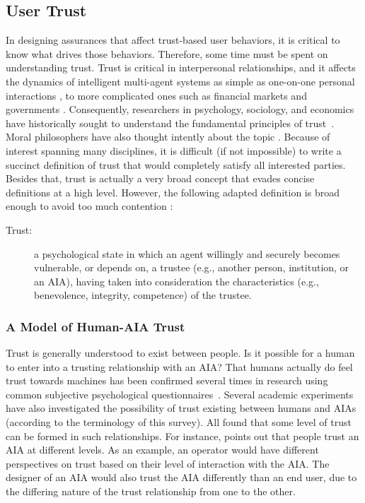 \subsection{User Trust} \label{sec:trust}
    In designing assurances that affect trust-based user behaviors, it is critical to know what drives those behaviors. Therefore, some time must be spent on understanding trust. Trust is critical in interpersonal relationships, and it affects the dynamics of intelligent multi-agent systems as simple as one-on-one personal interactions  \cite{Lewicki2006-hj}, to more complicated ones such as financial markets and governments \cite{Fukuyama1995-un}. Consequently, researchers in psychology, sociology, and economics have historically sought to understand the fundamental principles of trust~\cite{Gambetta1988-pi}. Moral philosophers have also thought intently about the topic \cite{Baier1986-im}. Because of interest spanning many disciplines, it is difficult (if not impossible) to write a succinct definition of trust that would completely satisfy all interested parties. Besides that, trust is actually a very broad concept that evades concise definitions at a high level. However, the following adapted definition is broad enough to avoid too much contention \cite{McKnight2004-vv}:

    \begin{description}
        \item [Trust:] a psychological state in which an agent willingly and securely becomes vulnerable, or depends on, a trustee (e.g., another person, institution, or an AIA), having taken into consideration the characteristics (e.g., benevolence, integrity, competence) of the trustee.
    \end{description}

    \subsubsection{A Model of Human-AIA Trust}
        Trust is generally understood to exist between people. Is it possible for a human to enter into a trusting relationship with an AIA? That humans actually do feel trust towards machines has been confirmed several times in research using common subjective psychological questionnaires~\cite{Muir1996-gt,Mcknight2011-gv,Riley1996-qm,Bainbridge2011-pl,Salem2015-md,Desai2012-rc, Freedy2007-sg, Kaniarasu2013-ho, Wang2016-id}. Several academic experiments have also investigated the possibility of trust existing between humans and AIAs (according to the terminology of this survey).  All found that some level of trust can be formed in such relationships. For instance, \citet{Lacher2014-yc} points out that people trust an AIA at different levels. As an example, an operator would have different perspectives on trust based on their level of interaction with the AIA. The designer of an AIA would also trust the AIA differently than an end user, due to the differing nature of the trust relationship from one to the other. 

